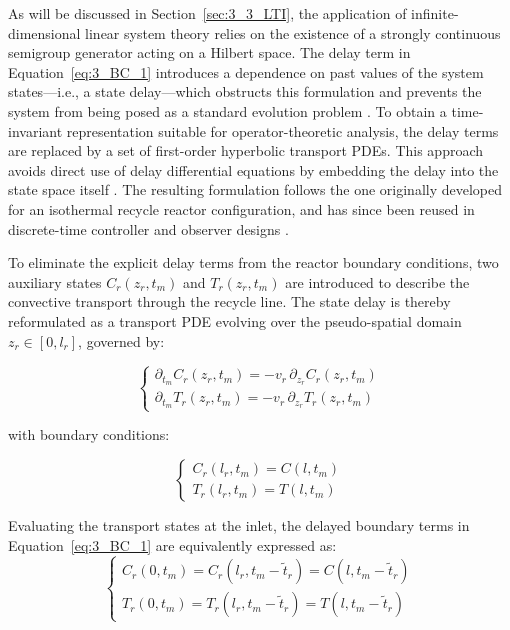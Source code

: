 As will be discussed in Section~\ref{sec:3_3_LTI}, the application of infinite-dimensional linear system theory relies on the existence of a strongly continuous semigroup generator acting on a Hilbert space. The delay term in Equation~\eqref{eq:3_BC_1} introduces a dependence on past values of the system states—i.e., a state delay—which obstructs this formulation and prevents the system from being posed as a standard evolution problem \autocite{Curtain2020Introduction}. To obtain a time-invariant representation suitable for operator-theoretic analysis, the delay terms are replaced by a set of first-order hyperbolic transport PDEs. This approach avoids direct use of delay differential equations by embedding the delay into the state space itself \autocite{Krstic2009Delay}. The resulting formulation follows the one originally developed for an isothermal recycle reactor configuration, and has since been reused in discrete-time controller and observer designs \autocite{Moadeli2025Optimal,Moadeli2025Model,Moadeli2025Observer}.

To eliminate the explicit delay terms from the reactor boundary conditions, two auxiliary states $C_r(z_r, t_m)$ and $T_r(z_r, t_m)$ are introduced to describe the convective transport through the recycle line. The state delay is thereby reformulated as a transport PDE evolving over the pseudo-spatial domain $z_r \in [0, l_r]$, governed by:

\begin{equation} \label{eq:3_transport_PDE}
    \begin{cases}
        \partial_{t_m} C_r(z_r, t_m) = - v_r \, \partial_{z_r} C_r(z_r, t_m) \\
        \partial_{t_m} T_r(z_r, t_m) = - v_r \, \partial_{z_r} T_r(z_r, t_m)
    \end{cases}
\end{equation}

with boundary conditions:

\begin{equation} \label{eq:3_transport_BC}
    \begin{cases}
        C_r(l_r, t_m) = C(l, t_m) \\
        T_r(l_r, t_m) = T(l, t_m)
    \end{cases}
\end{equation}

Evaluating the transport states at the inlet, the delayed boundary terms in Equation~\eqref{eq:3_BC_1} are equivalently expressed as:
\begin{equation} \label{eq:3_delay_identity}
    \begin{cases}
        C_r(0, t_m) = C_r(l_r, t_m - \tilde{t}_r) = C(l, t_m - \tilde{t}_r) \\
        T_r(0, t_m) = T_r(l_r, t_m - \tilde{t}_r) = T(l, t_m - \tilde{t}_r)
    \end{cases}
\end{equation}

